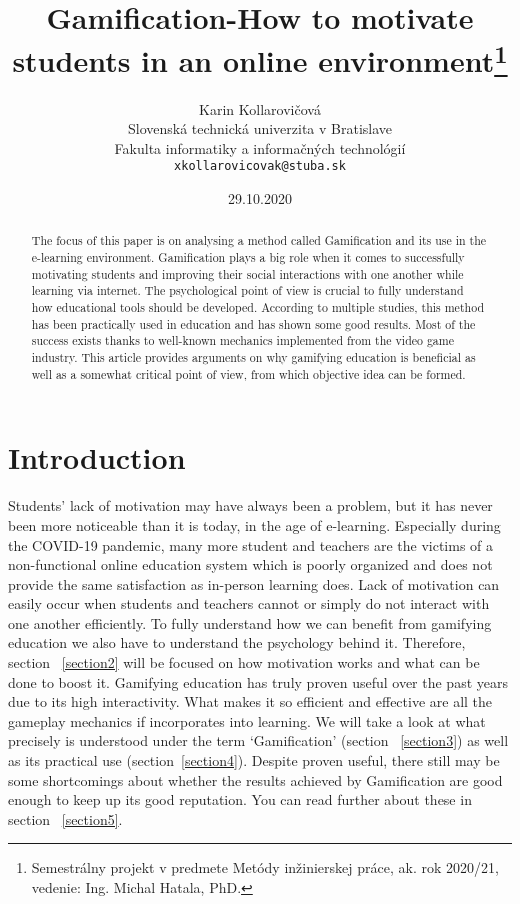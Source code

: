 \documentclass[10pt,twoside,english,a4paper]{article}
\title{Gamification-How to motivate students in an online environment\thanks{Semestrálny projekt v predmete Metódy inžinierskej práce, ak. rok 2020/21, vedenie: Ing. Michal Hatala, PhD.}}
\author{Karin Kollarovičová\\[2pt]
	{\small Slovenská technická univerzita v Bratislave}\\
	{\small Fakulta informatiky a informačných technológií}\\
	{\small \texttt{xkollarovicovak@stuba.sk}}
	}
\date{\small 29.10.2020}
\begin{document}
\maketitle

\begin{abstract}
	The focus of this paper is on analysing a method called Gamification and its use in the e-learning environment. 
	Gamification plays a big role when it comes to successfully motivating students and improving their social interactions with one another while learning via internet. 
	The psychological point of view is crucial to fully understand how educational tools should be developed. 
	According to multiple studies, this method has been practically used in education and has shown some good results. 
	Most of the success exists thanks to well-known mechanics implemented from the video game industry. 
	This article provides arguments on why gamifying education is beneficial as well as a somewhat critical point of view, from which objective idea can be formed. 
\end{abstract}



\section{Introduction} \label{introduction}
	Students’ lack of motivation may have always been a problem, but it has never been more noticeable than it is today, in the age of e-learning. 
	Especially during the COVID-19 pandemic, many more student and teachers are the victims of a non-functional online education system which is poorly organized and does not provide the same satisfaction as in-person learning does.
	Lack of motivation can easily occur when students and teachers cannot or simply do not interact with one another efficiently. To fully understand how we can benefit from gamifying education we also have to understand the psychology behind it. 
	Therefore, section ~\ref{section2} will be focused on how motivation works and what can be done to boost it.
	Gamifying education has truly proven useful over the past years due to its high interactivity. What makes it so efficient and effective are all the gameplay mechanics if incorporates into learning.
	We will take a look at what precisely is understood under the term ‘Gamification’ (section ~\ref{section3}) as well as its practical use (section~\ref{section4}).
	Despite proven useful, there still may be some shortcomings about whether the results achieved by Gamification are good enough to keep up its good reputation. You can read further about these in section ~\ref{section5}.
\end{document}

